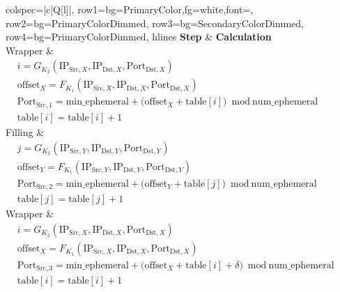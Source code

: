 \documentclass[twocolumn]{report}
\begin{document}
\begin{center}
	\begin{adjustbox}{max width=0.95\columnwidth}
		\begin{tblr}{
			colspec={|c|Q[l]|},
			row{1}={bg=PrimaryColor,fg=white,font=\bfseries},
			row{2}={bg=PrimaryColorDimmed},
			row{3}={bg=SecondaryColorDimmed},
			row{4}={bg=PrimaryColorDimmed},
			hlines
			}
			\textbf{Step} & \textbf{Calculation} \\

			Wrapper       &
			\(
			\begin{aligned}
				 & i = G_{K_2}(\text{IP}_{\text{Src},X}, \text{IP}_{\text{Dst},X}, \text{Port}_{\text{Dst},X})                                   \\
				 & \text{offset}_X = F_{K_1}(\text{IP}_{\text{Src},X}, \text{IP}_{\text{Dst},X}, \text{Port}_{\text{Dst},X})                     \\
				 & \text{Port}_{\text{Src},1} = \text{min\_ephemeral} + \bigl(\text{offset}_X + \text{table}[i]\bigr)\bmod \text{num\_ephemeral} \\
				 & \text{table}[i] = \text{table}[i] + 1
			\end{aligned}
			\)                                   \\

			Filling       &
			\(
			\begin{aligned}
				 & j = G_{K_2}(\text{IP}_{\text{Src},Y}, \text{IP}_{\text{Dst},Y}, \text{Port}_{\text{Dst},Y})                                   \\
				 & \text{offset}_Y = F_{K_1}(\text{IP}_{\text{Src},Y}, \text{IP}_{\text{Dst},Y}, \text{Port}_{\text{Dst},Y})                     \\
				 & \text{Port}_{\text{Src},2} = \text{min\_ephemeral} + \bigl(\text{offset}_Y + \text{table}[j]\bigr)\bmod \text{num\_ephemeral} \\
				 & \text{table}[j] = \text{table}[j] + 1
			\end{aligned}
			\)                                   \\

			Wrapper       &
			\(
			\begin{aligned}
				 & i = G_{K_2}(\text{IP}_{\text{Src},X}, \text{IP}_{\text{Dst},X}, \text{Port}_{\text{Dst},X})                                             \\
				 & \text{offset}_X = F_{K_1}(\text{IP}_{\text{Src},X}, \text{IP}_{\text{Dst},X}, \text{Port}_{\text{Dst},X})                               \\
				 & \text{Port}_{\text{Src},3} = \text{min\_ephemeral} + \bigl(\text{offset}_X + \text{table}[i] + \delta \bigr)\bmod \text{num\_ephemeral} \\
				 & \text{table}[i] = \text{table}[i] + 1
			\end{aligned}
			\)                                   \\
		\end{tblr}
	\end{adjustbox}
\end{center}
\end{document}
